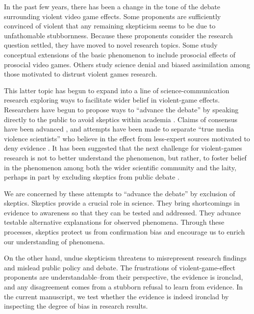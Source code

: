 \documentclass[man]{apa6}
\begin{document}
In the past few years, there has been a change in the tone of the debate surrounding violent video game effects. Some proponents are sufficiently convinced of violent that any remaining skepticism seems to be due to unfathomable stubbornness. Because these proponents consider the research question settled, they have moved to novel research topics. Some study conceptual extensions of the basic phenomenon to include prosocial effects of prosocial video games. Others study science denial and biased assimilation among those motivated to distrust violent games research. 

This latter topic has begun to expand into a line of science-communication research exploring ways to facilitate wider belief in violent-game effects.   Researchers have begun to propose ways to ``advance the debate'' by speaking directly to the public to avoid skeptics within academia \citep{Strasburger:Donnerstein:2014}. Claims of consensus have been advanced \citep{Bushman:etal:2014}, and attempts have been made to separate ``true media violence scientists'' who believe in the effect from less-expert sources motivated to deny evidence \citep{Anderson:etal:2014}. It has been suggested that the next challenge for violent-games research is not to better understand the phenomenon, but rather, to foster belief in the phenomenon among both the wider scientific community and the laity, perhaps in part by excluding skeptics from public debate \citep{Anderson:etal:2014}.

We are concerned by these attempts to ``advance the debate'' by exclusion of skeptics. Skeptics provide a crucial role in science. They bring shortcomings in evidence to awareness so that they can be tested and addressed. They advance testable alternative explanations for observed phenomena. Through these processes, skeptics protect us from confirmation bias and encourage us to enrich our understanding of phenomena.

On the other hand, undue skepticism threatens to misrepresent research findings and mislead public policy and debate. The frustrations of violent-game-effect proponents are understandable--from their perspective, the evidence is ironclad, and any disagreement comes from a stubborn refusal to learn from evidence. In the current manuscript, we test whether the evidence is indeed ironclad by inspecting the degree of bias in research results.

\end{document}
